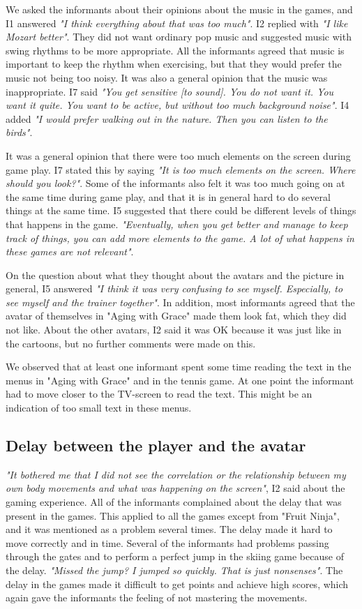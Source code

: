 We asked the informants about their opinions about the music in the games, and I1 answered \emph{"I think everything about that was too much"}. I2 replied with \emph{"I like Mozart better"}. They did not want ordinary pop music and suggested music with swing rhythms to be more appropriate. All the informants agreed that music is important to keep the rhythm when exercising, but that they would prefer the music not being too noisy. It was also a general opinion that the music was inappropriate.  I7 said \emph{"You get sensitive [to sound]. You do not want it. You want it quite. You want to be active, but without too much background noise"}. I4 added \emph{"I would prefer walking out in the nature. Then you can listen to the birds"}.

It was a general opinion that there were too much elements on the screen during game play. I7 stated this by saying \emph{"It is too much elements on the screen. Where should you look?"}. Some of the informants also felt it was too much going on at the same time during game play, and that it is in general hard to do several things at the same time. I5 suggested that there could be different levels of things that happens in the game.  \emph{"Eventually, when you get better and manage to keep track of things, you can add more elements to the game. A lot of what happens in these games are not relevant"}. 

On the question about what they thought about the avatars and the picture in general, I5 answered \emph{"I think it was very confusing to see myself. Especially, to see myself and the trainer together"}. In addition, most informants agreed that the avatar of themselves in "Aging with Grace" made them look fat, which they did not like. About the other avatars, I2 said it was OK because it was just like in the cartoons, but no further comments were made on this.  

We observed that at least one informant spent some time reading the text in the menus in "Aging with Grace" and in the tennis game. At one point the informant had to move closer to the TV-screen to read the text. This might be an indication of too small text in these menus. 

\subsection{Delay between the player and the avatar}

\emph{"It bothered me that I did not see the correlation or the relationship between my own body movements and what was happening on the screen"}, I2 said about the gaming experience. All of the informants complained about the delay that was present in the games. This applied to all the games except from "Fruit Ninja", and it was mentioned as a problem several times. The delay made it hard to move correctly and in time. Several of the informants had problems passing through the gates and to perform a perfect jump in the skiing game because of the delay. \emph{"Missed the jump? I jumped so quickly. That is just nonsenses"}. The delay in the games made it difficult to get points and achieve high scores, which again gave the informants the feeling of not mastering the movements. 

